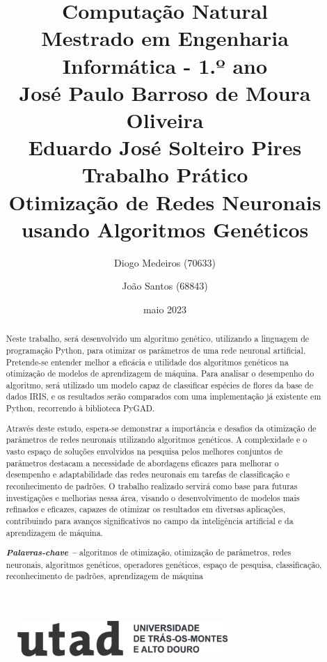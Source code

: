 \documentclass[a4paper, portuguese]{report}
\title{{\textbf{Computação Natural}}\\ Mestrado em Engenharia Informática - 1.º ano\\\vspace*{1cm} José Paulo Barroso de Moura Oliveira\\ Eduardo José Solteiro Pires\\\vspace*{3cm}\textbf{Trabalho Prático}\\\vspace*{0.5cm} Otimização de Redes Neuronais usando Algoritmos Genéticos \vspace*{1cm}}
\author{Diogo Medeiros (70633) \and João Santos (68843)}
\date{maio 2023}
\providecommand{\keywords}[1]
{
    \small
    \textbf{\textit{Palavras-chave --}} #1
}
\begin{document}
    \begin{figure}
        \includegraphics[width=8cm]{images/utad}
        \label{fig:utad_logo}
    \end{figure}
    
    \maketitle
    
    \begin{abstract}

        Neste trabalho, será desenvolvido um algoritmo genético, utilizando a linguagem de programação Python, para otimizar os parâmetros de uma rede neuronal artificial.
        Pretende-se entender melhor a eficácia e utilidade dos algoritmos genéticos na otimização de modelos de aprendizagem de máquina.
        Para analisar o desempenho do algoritmo, será utilizado um modelo capaz de classificar espécies de flores da base de dados IRIS, e os resultados serão comparados com uma implementação já existente em Python, recorrendo à biblioteca PyGAD.

        Através deste estudo, espera-se demonstrar a importância e desafios da otimização de parâmetros de redes neuronais utilizando algoritmos genéticos. A complexidade e o vasto espaço de soluções envolvidos na pesquisa pelos melhores conjuntos de parâmetros destacam a necessidade de abordagens eficazes para melhorar o desempenho e adaptabilidade das redes neuronais em tarefas de classificação e reconhecimento de padrões. O trabalho realizado servirá como base para futuras investigações e melhorias nessa área, visando o desenvolvimento de modelos mais refinados e eficazes, capazes de otimizar os resultados em diversas aplicações, contribuindo para avanços significativos no campo da inteligência artificial e da aprendizagem de máquina.

        \keywords{algoritmos de otimização, otimização de parâmetros, redes neuronais, algoritmos genéticos, operadores genéticos, espaço de pesquisa, classificação, reconhecimento de padrões, aprendizagem de máquina}

    \end{abstract}
    
    \tableofcontents
    \listoffigures
    \listoftables
    \listoflistings
\end{document}
